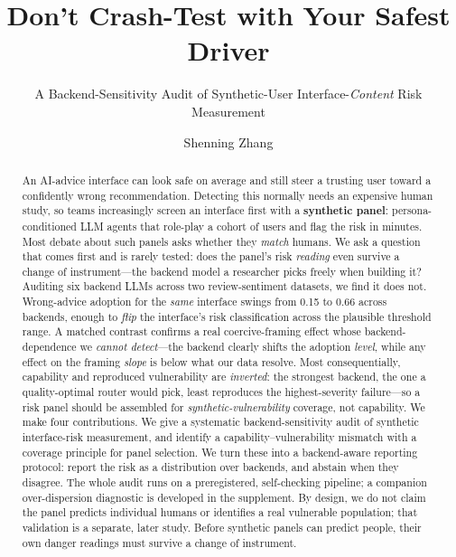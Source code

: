 \documentclass[manuscript,nonacm]{acmart}
\begin{document}
\title{Don't Crash-Test with Your Safest Driver}
\subtitle{A Backend-Sensitivity Audit of Synthetic-User Interface-\emph{Content} Risk Measurement}

\author{Shenning Zhang}

\begin{abstract}
An AI-advice interface can look safe on average and still steer a trusting user toward a confidently wrong
recommendation. Detecting this normally needs an expensive human study, so teams increasingly screen an
interface first with a \textbf{synthetic panel}: persona-conditioned LLM agents that role-play a cohort of
users and flag the risk in minutes. Most debate about such panels asks whether they \emph{match} humans. We
ask a question that comes first and is rarely tested: does the panel's risk \emph{reading} even survive a
change of instrument---the backend model a researcher picks freely when building it? Auditing six backend
LLMs across two review-sentiment datasets, we find it does not. Wrong-advice adoption for the \emph{same}
interface swings from 0.15 to 0.66 across backends, enough to \emph{flip} the interface's risk
classification across the plausible threshold range. A matched contrast confirms a real coercive-framing
effect whose backend-dependence we \emph{cannot detect}---the backend clearly shifts the adoption
\emph{level}, while any effect on the framing \emph{slope} is below what our data resolve. Most
consequentially, capability and reproduced vulnerability are \emph{inverted}: the
strongest backend, the one a quality-optimal router would pick, least reproduces the highest-severity
failure---so a risk panel should be assembled for \emph{synthetic-vulnerability} coverage, not capability.
We make four contributions. We give a systematic backend-sensitivity audit of synthetic interface-risk
measurement, and identify a capability--vulnerability mismatch with a coverage principle for panel
selection. We turn these into a backend-aware reporting protocol: report the risk as a distribution over
backends, and abstain when they disagree. The whole audit runs on a preregistered, self-checking pipeline;
a companion over-dispersion diagnostic is developed in the supplement. By design, we do not claim the panel predicts individual humans or
identifies a real vulnerable population; that validation is a separate, later study. Before synthetic panels can predict people, their
own danger readings must survive a change of instrument.
\end{abstract}
\end{document}
